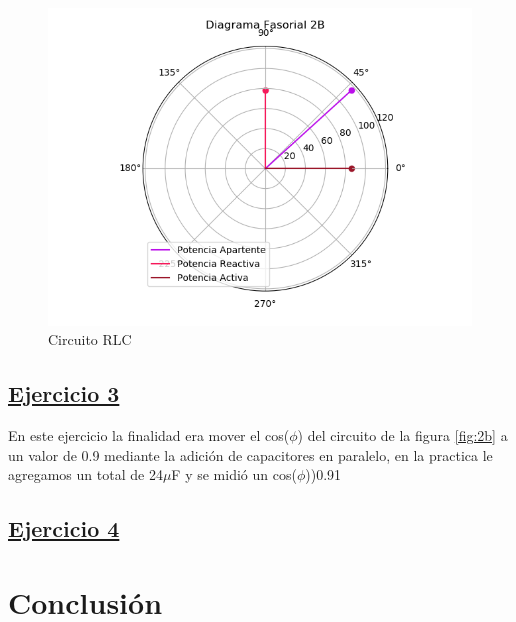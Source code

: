 \documentclass[a4paper]{article}
\begin{document}
\begin{figure}[H]
\begin{minipage}{.5\textwidth}
\end{minipage}\\
\begin{minipage}{.5\textwidth}
  \centering
  \includegraphics[width=1.2\linewidth]{Diag-Fas-2C}
  \caption{Circuito RLC}
\end{minipage}
\end{figure}

\newpage

\subsection*{\underline{Ejercicio 3}}
En este ejercicio la finalidad era mover el cos($\phi$) del circuito de la figura \ref{fig:2b} a un valor de 0.9 mediante la adición de capacitores en paralelo, en la practica le agregamos un total de 24$\mu$F y se midió un cos($\phi$))0.91


\subsection*{\underline{Ejercicio 4}}

\section*{Conclusión}
\end{document}
